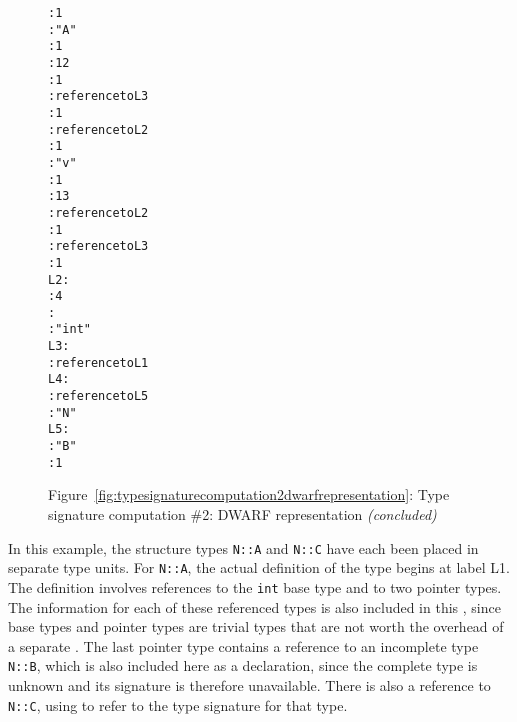 \begin{figure}
\begin{dwflisting}
\begin{alltt}
      \DWTAGsubprogram
           \DWATexternal : 1
           \DWATname : "A"
           \DWATdeclfile : 1
           \DWATdeclline : 12
           \DWATdeclaration : 1
        \DWTAGformalparameter
           \DWATtype : reference to L3
           \DWATartificial : 1
        \DWTAGformalparameter
           \DWATtype : reference to L2
       \DWTAGsubprogram
           \DWATexternal : 1
           \DWATname : "v"
           \DWATdeclfile : 1
           \DWATdeclline : 13
           \DWATtype : reference to L2
           \DWATdeclaration : 1
         \DWTAGformalparameter
           \DWATtype : reference to L3
           \DWATartificial : 1
L2:
    \DWTAGbasetype
         \DWATbytesize : 4
         \DWATencoding : \DWATEsigned
         \DWATname : "int"
L3:
    \DWTAGpointertype
         \DWATtype : reference to L1
L4:
    \DWTAGpointertype
         \DWATtype : reference to L5
    \DWTAGnamespace
         \DWATname : "N"
L5:
       \DWTAGstructuretype
           \DWATname : "B"
           \DWATdeclaration : 1
\end{alltt}
\end{dwflisting}
\begin{center}
\vspace{2mm}
Figure~\ref{fig:typesignaturecomputation2dwarfrepresentation}: Type signature computation \#2: DWARF representation \textit{(concluded)}
\end{center}
\end{figure}

In this example, the structure types \texttt{N::A} and \texttt{N::C} have each
been placed in separate 
type units.  For \texttt{N::A}, the actual
definition of the type begins at label L1. The definition
involves references to the \texttt{int} base type and to two pointer
types. The information for each of these referenced types is
also included in this , 
since base types and pointer
types are trivial types that are not worth the overhead of a
separate . 
The last pointer type contains a reference
to an incomplete type \texttt{N::B}, which is also included here as
a declaration, since the complete type is unknown and its
signature is therefore unavailable. There is also a reference
to \texttt{N::C}, using 
\DWFORMrefsigeight{} to 
refer to the type signature
for that type.

